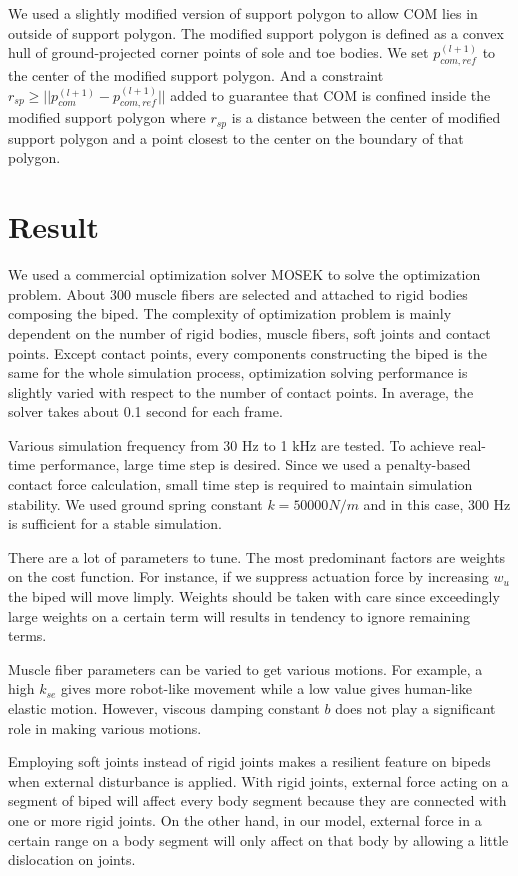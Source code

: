 \documentclass{acm_proc_article-sp}
\begin{document}
We used a slightly modified version of support polygon
to allow COM lies in outside of support polygon.
The modified support polygon is defined as a convex hull of
ground-projected corner points of sole and toe bodies.
We set $p_{com,ref}^{(l+1)}$ to the center of the modified
support polygon. And a constraint
$r_{sp} \geq || p^{(l+1)}_{com} - p^{(l+1)}_{com,ref} ||$
added to guarantee that COM is confined inside the modified
support polygon where $r_{sp}$ is a distance between the
center of modified support polygon and a point closest to
the center on the boundary of that polygon.

\section{Result}
We used a commercial optimization solver MOSEK to solve
the optimization problem.
About 300 muscle fibers are selected and attached to
rigid bodies composing the biped.
The complexity of optimization problem is mainly
dependent on the number of rigid bodies, muscle fibers, soft joints
and contact points. Except contact points, every components
constructing the biped is the same for the whole simulation process,
optimization solving performance is slightly varied with respect
to the number of contact points. In average, the solver takes
about 0.1 second for each frame.

Various simulation frequency from 30 Hz to 1 kHz
are tested. To achieve real-time performance,
large time step is desired. Since we used
a penalty-based contact force calculation, small
time step is required to maintain simulation stability.
We used ground spring constant $k=50000 N/m$ and
in this case, 300 Hz is sufficient for a stable simulation.

There are a lot of parameters to tune. The most
predominant factors are weights on the cost function.
For instance, if we suppress actuation force by increasing $w_u$
the biped will move limply. Weights should be taken with care since
exceedingly large weights on a certain term will results in
tendency to ignore remaining terms.

Muscle fiber parameters can be varied to get various motions.
For example, a high $k_{se}$ gives more robot-like movement while a low value
gives human-like elastic motion. However, viscous damping constant
$b$ does not play a significant role in making various motions.

Employing soft joints instead of rigid joints makes a resilient
feature on bipeds when external disturbance is applied.
With rigid joints, external force acting on a segment of biped
will affect every body segment because they are connected with
one or more rigid joints. On the other hand, in our model,
external force in a certain range on a body segment will only
affect on that body by allowing a little dislocation on joints.
\end{document}
